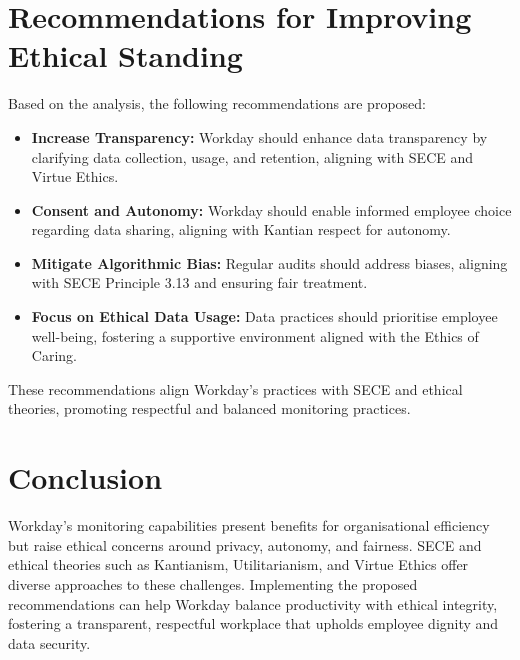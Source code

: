 \documentclass[a4paper]{article}
\begin{document}
\section{Recommendations for Improving Ethical Standing}
Based on the analysis, the following recommendations are proposed:
\begin{itemize}
    \item \textbf{Increase Transparency:} Workday should enhance data transparency by clarifying data collection, usage, and retention, aligning with SECE and Virtue Ethics.
    \item \textbf{Consent and Autonomy:} Workday should enable informed employee choice regarding data sharing, aligning with Kantian respect for autonomy.
    \item \textbf{Mitigate Algorithmic Bias:} Regular audits should address biases, aligning with SECE Principle 3.13 and ensuring fair treatment.
    \item \textbf{Focus on Ethical Data Usage:} Data practices should prioritise employee well-being, fostering a supportive environment aligned with the Ethics of Caring.
\end{itemize}
These recommendations align Workday’s practices with SECE and ethical theories, promoting respectful and balanced monitoring practices.

\section{Conclusion}
Workday’s monitoring capabilities present benefits for organisational efficiency but raise ethical concerns around privacy, autonomy, and fairness. SECE and ethical theories such as Kantianism, Utilitarianism, and Virtue Ethics offer diverse approaches to these challenges. Implementing the proposed recommendations can help Workday balance productivity with ethical integrity, fostering a transparent, respectful workplace that upholds employee dignity and data security.



\end{document}
